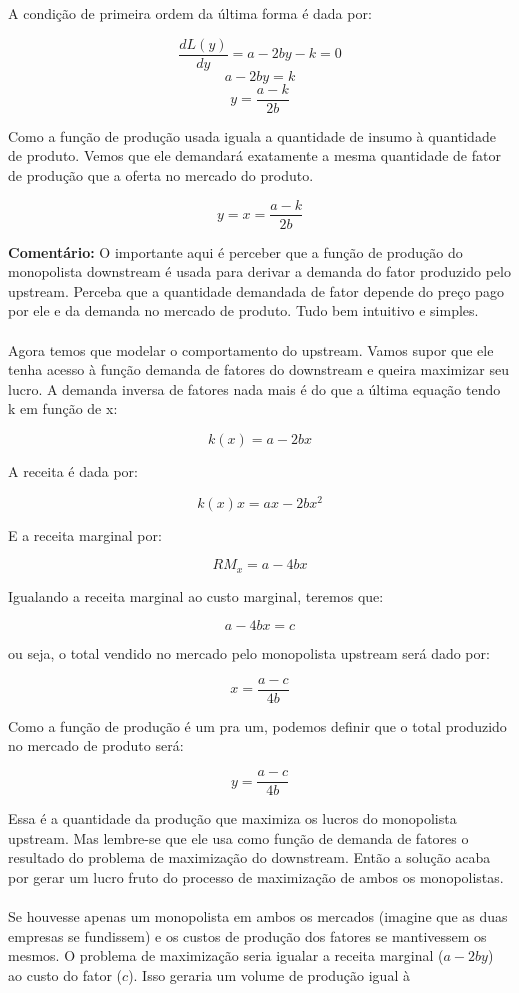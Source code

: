 \documentclass[a4paper,11pt,oneside]{book}
\theoremstyle{definition}
\theoremstyle{break}
\begin{document}
A condição de primeira ordem da última forma é dada por:

$$ \frac{d L(y)}{d y} = a - 2by - k = 0 $$
$$ a - 2by = k $$
$$ y = \frac{a - k}{2b} $$

Como a função de produção usada iguala a quantidade de insumo à quantidade de produto. Vemos que ele demandará exatamente a mesma quantidade de fator de produção que a oferta no mercado do produto.

$$ y = x = \frac{a - k}{2b} $$

\textbf{Comentário:} O importante aqui é perceber que a função de produção do monopolista downstream é usada para derivar a demanda do fator produzido pelo upstream. Perceba que a quantidade demandada de fator depende do preço pago por ele e da demanda no mercado de produto. Tudo bem intuitivo e simples.
\\~\\
Agora temos que modelar o comportamento do upstream. Vamos supor que ele tenha acesso à função demanda de fatores do downstream e queira maximizar seu lucro. A demanda inversa de fatores nada mais é do que a última equação tendo k em função de x:

$$ k(x) = a - 2bx $$

A receita é dada por:

$$ k(x)x = ax - 2bx^2 $$

E a receita marginal por:

$$ RM_x = a - 4bx $$

Igualando a receita marginal ao custo marginal, teremos que:

$$ a - 4bx = c $$

ou seja, o total vendido no mercado pelo monopolista upstream será dado por:

$$ x = \frac{a - c}{4b} $$

Como a função de produção é um pra um, podemos definir que o total produzido no mercado de produto será:

$$ y = \frac{a - c}{4b} $$

Essa é a quantidade da produção que maximiza os lucros do monopolista upstream. Mas lembre-se que ele usa como função de demanda de fatores o resultado do problema de maximização do downstream. Então a solução acaba por gerar um lucro fruto do processo de maximização de ambos os monopolistas.
\\~\\
Se houvesse apenas um monopolista em ambos os mercados (imagine que as duas empresas se fundissem) e os custos de produção dos fatores se mantivessem os mesmos. O problema de maximização seria igualar a receita marginal ($a - 2by$) ao custo do fator ($c$). Isso geraria um volume de produção igual à
\end{document}
